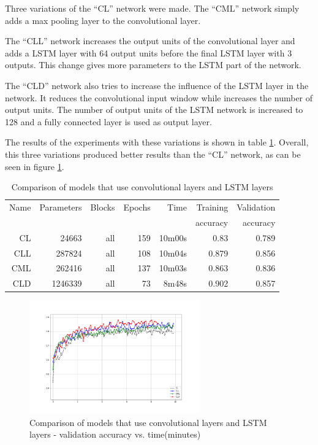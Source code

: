 
Three variations of the ``CL'' network were made.
The ``CML'' network simply adds a max pooling layer to the convolutional layer.

The ``CLL'' network increases the output units of the convolutional layer and adds a LSTM layer with 64 output units before the final LSTM layer with 3 outputs. This change gives more parameters to the LSTM part of the network.

The ``CLD'' network also tries to increase the influence of the LSTM layer in the network. It reduces the convolutional input window while increases the number of output units. The number of output units of the LSTM network is increased to 128 and a fully connected layer is used as output layer.

The results of the experiments with these variations is shown in table \ref{tab:carvingclvariations}.
Overall, this three variations produced better results than the ``CL'' network, as can be seen in figure \ref{fig:cl-variations}.

\begin{table}[!ht]
    \centering
    \caption[CL variations]{Comparison of models that use convolutional layers and LSTM layers}
    \label{tab:carvingclvariations}
\begin{tabular}{r|r|r|r|r|r|r}
\hline
Name & Parameters & Blocks & Epochs & Time    & Training          & Validation          \\       
     &            &        &        &         &          accuracy &            accuracy \\ \hline\hline

CL      & 24663     & all   & 159   & 10m00s    & 0.83  & 0.789 \\\hline
CLL     & 287824    & all   & 108   & 10m04s    & 0.879 & 0.856 \\\hline
CML     & 262416    & all   & 137   & 10m03s    & 0.863 & 0.836 \\\hline
CLD     & 1246339   & all   & 73    & 8m48s     & 0.902 & 0.857 \\\hline
\end{tabular}
\end{table}

\begin{figure}[htb!]
\centering\includegraphics[width=0.65\textwidth]{content/CL-CLL-CML-CLD.png}
\caption[CL variations]{\label{fig:cl-variations}Comparison of models that use convolutional layers and LSTM layers - validation accuracy vs. time(minutes)}%
\end{figure}
